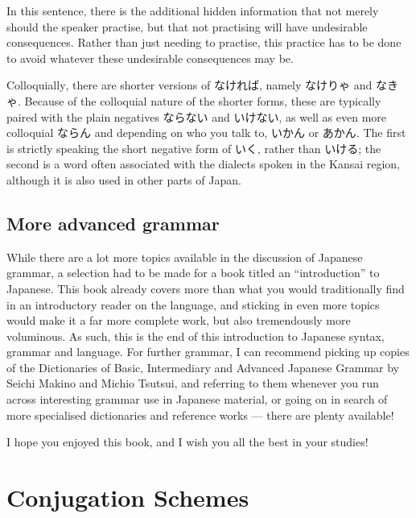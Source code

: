 \documentclass[11pt, b5paper, twoside, openright, onecolumn]{book}
\newcommand{\nameheaders}[1]{
	\fancyhead{} %
	\fancyhead[RO,LE]{\thepage}
	\fancyhead[LO,RE]{\nouppercase{#1}}
	\pagestyle{fancy}}
\begin{document}
In this sentence‚ there is the additional hidden information that not merely should the speaker practise‚ but that not practising will have undesirable consequences. Rather than just needing to practise‚ this practice has to be done to avoid whatever these undesirable consequences may be.

Colloquially‚ there are shorter versions of なければ‚ namely なけりゃ and なきゃ.  Because of the colloquial nature of the shorter forms‚ these are typically paired with the plain negatives ならない and いけない‚ as well as even more colloquial ならん and depending on who you talk to‚ いかん or あかん. The first is strictly speaking the short negative form of いく‚ rather than いける; the second is a word often associated with the dialects spoken in the Kansai region‚ although it is also used in other parts of Japan.

\section{More advanced grammar}

While there are a lot more topics available in the discussion of Japanese grammar‚ a selection had to be made for a book titled an “introduction” to Japanese. This book already covers more than what you would traditionally find in an introductory reader on the language‚ and sticking in even more topics would make it a far more complete work‚ but also tremendously more voluminous. As such‚ this is the end of this introduction to Japanese syntax‚ grammar and language. For further grammar‚ I can recommend picking up copies of the Dictionaries of Basic‚ Intermediary and Advanced Japanese Grammar by Seichi Makino and Michio Tsutsui‚ and referring to them whenever you run across interesting grammar use in Japanese material‚ or going on in search of more specialised dictionaries and reference works — there are plenty available!

\vspace{2em}

I hope you enjoyed this book‚ and I wish you all the best in your studies!


\clearpage

\appendix
\appendixpage
\addappheadtotoc

\renewcommand{\chaptername}{Appendix }

\chapter{Conjugation Schemes}
\nameheaders{Conjugation Schemes}
\end{document}
